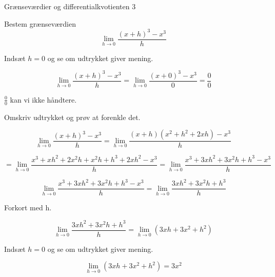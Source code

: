 \documentclass{article}
\begin{document}
\newpage
\begin{exercise}{Grænseværdier og differentialkvotienten 3}
	
	Bestem grænseværdien 
	\[
	\lim_{h \to 0} \frac{(x+h)^3-x^3}{h}
	\]
	
	
	\hint
	Indsæt $h=0$ og se om udtrykket giver mening.
	
	\hint
	\[
	\lim_{h \to 0} \frac{(x+h)^3-x^3}{h} = \lim_{h \to 0} \frac{(x+0)^3-x^3}{0} = \frac{0}{0}
	\]
	
	\hint
	$\frac{0}{0}$ kan vi ikke håndtere.
	
	\hint
	Omskriv udtrykket og prøv at forenkle det.
	
	\hint
	\[
	\lim_{h \to 0} \frac{(x+h)^3-x^3}{h} = \lim_{h \to 0} \frac{(x+h)(x^2+h^2+2xh)-x^3}{h} 
	\]
	
	\hint
	\[
	= \lim_{h \to 0} \frac{x^3+xh^2+2x^2h+x^2h+h^3+2xh^2-x^3}{h}  = \lim_{h \to 0} \frac{x^3+3xh^2+3x^2h+h^3-x^3}{h}
	\]
	
	
	\hint
	\[
 	\lim_{h \to 0} \frac{x^3+3xh^2+3x^2h+h^3-x^3}{h} =  \lim_{h \to 0} \frac{3xh^2+3x^2h+h^3}{h}
	\]
	
	\hint
	Forkort med h.
	
	\hint
	\[
	\lim_{h \to 0} \frac{3xh^2+3x^2h+h^3}{h} = \lim_{h \to 0} \left(3xh+3x^2+h^2\right)
	\]
	
	\hint
	Indsæt $h=0$ og se om udtrykket giver mening.
	
	\hint
	\[
	\lim_{h \to 0} \left(3xh+3x^2+h^2\right) = 3x^2
	\]
	
\end{exercise}
\end{document}
